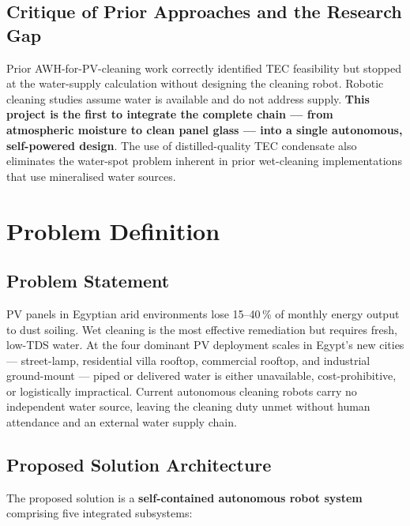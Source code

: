 \documentclass[12pt,a4paper]{report}
\numberwithin{equation}{chapter}
\numberwithin{figure}{chapter}
\numberwithin{table}{chapter}
\begin{document}
\section{Critique of Prior Approaches and the Research Gap}

Prior AWH-for-PV-cleaning work correctly identified TEC feasibility but stopped at the
water-supply calculation without designing the cleaning robot. Robotic cleaning studies
assume water is available and do not address supply. \textbf{This project is the first to
integrate the complete chain --- from atmospheric moisture to clean panel glass --- into a
single autonomous, self-powered design}. The use of distilled-quality TEC condensate
also eliminates the water-spot problem inherent in prior wet-cleaning implementations
that use mineralised water sources.

\chapter{Problem Definition}

\section{Problem Statement}

PV panels in Egyptian arid environments lose 15--40\,\% of monthly energy output to dust
soiling. Wet cleaning is the most effective remediation but requires fresh, low-TDS water.
At the four dominant PV deployment scales in Egypt's new cities --- street-lamp,
residential villa rooftop, commercial rooftop, and industrial ground-mount ---
piped or delivered water is either
unavailable, cost-prohibitive, or logistically impractical. Current autonomous cleaning
robots carry no independent water source, leaving the cleaning duty unmet without human
attendance and an external water supply chain.

\section{Proposed Solution Architecture}

The proposed solution is a \textbf{self-contained autonomous robot system} comprising
five integrated subsystems:
\end{document}
